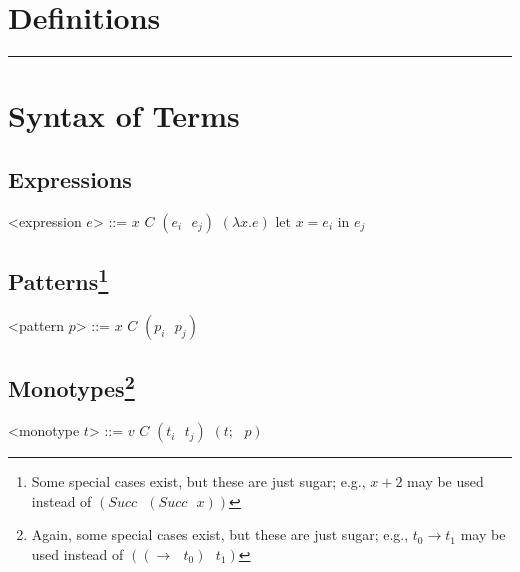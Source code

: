\documentclass[letterpaper]{article}
\begin{document}
  \newcommand{\Inst}{\textrm{Inst}}
  \newcommand{\Gen}{\textrm{Gen}}
  \newcommand{\Unify}{\textrm{Unify}}

  \section*{Definitions}
  \hrule


  \section*{Syntax of Terms}

  \vspace*{10pt}
  \subsection*{Expressions}
  \begin{grammar}
    \renewcommand{\syntleft}{}
    \renewcommand{\syntright}{}
    <expression $e$> ::= $x$
    \alt $C$
    \alt $(e_i \textrm{ } e_j)$
    \alt $(\lambda x . e)$
    \alt $\textrm{let }x = e_i\textrm{ in }e_j$
  \end{grammar}

  \subsection*{Patterns\footnote{Some special cases exist, but these are just sugar; e.g., $x + 2$ may be used instead of $(Succ\textrm{ }(Succ\textrm{ }x))$}}
  \begin{grammar}
    \renewcommand{\syntleft}{}
    \renewcommand{\syntright}{}
    <pattern $p$> ::= $x$
    \alt $C$
    \alt $(p_i \textrm{ } p_j)$
  \end{grammar}

  \subsection*{Monotypes\footnote{Again, some special cases exist, but these are just sugar; e.g., $t_0 \rightarrow t_1$ may be used instead of $((\rightarrow\textrm{ }t_0)\textrm{ }t_1)$}}
  \begin{grammar}
    \renewcommand{\syntleft}{}
    \renewcommand{\syntright}{}
    <monotype $t$> ::= $v$
    \alt $C$
    \alt $(t_i \textrm{ } t_j)$
    \alt $(t; \textrm{ } p)$
  \end{grammar}
\end{document}
